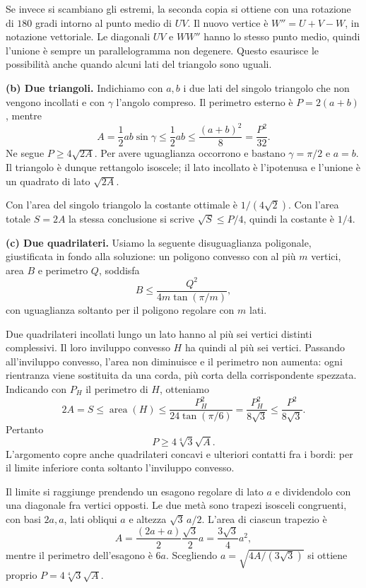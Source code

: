 {Se invece si scambiano gli estremi, la seconda copia si ottiene
con una rotazione di $180$ gradi intorno al punto medio di $UV$.
Il nuovo vertice \`e $W''=U+V-W$, in notazione vettoriale.
Le diagonali $UV$ e $WW''$ hanno lo stesso punto medio,
quindi l'unione \`e sempre un parallelogramma non degenere.
Questo esaurisce le possibilit\`a anche quando alcuni lati del
triangolo sono uguali.

\textbf{(b) Due triangoli.}
Indichiamo con $a,b$ i due lati del singolo triangolo che non vengono
incollati e con $\gamma$ l'angolo compreso. Il perimetro esterno \`e
$P=2(a+b)$, mentre
\[
 A=\frac12 ab\sin\gamma
 \le\frac12 ab
 \le\frac{(a+b)^2}{8}
 =\frac{P^2}{32}.
\]
Ne segue $P\ge4\sqrt{2A}$.
Per avere uguaglianza occorrono e bastano $\gamma=\pi/2$ e $a=b$.
Il triangolo \`e dunque rettangolo isoscele; il lato incollato
\`e l'ipotenusa e l'unione \`e un quadrato di lato $\sqrt{2A}$.

Con l'area del singolo triangolo la costante ottimale \`e
$1/(4\sqrt2)$. Con l'area totale $S=2A$ la stessa conclusione
si scrive $\sqrt S\le P/4$, quindi la costante \`e $1/4$.

\textbf{(c) Due quadrilateri.}
Usiamo la seguente disuguaglianza poligonale, giustificata in fondo
alla soluzione: un poligono convesso con al pi\`u $m$ vertici,
area $B$ e perimetro $Q$, soddisfa
\[
 B\le\frac{Q^2}{4m\tan(\pi/m)},
\]
con uguaglianza soltanto per il poligono regolare con $m$ lati.

Due quadrilateri incollati lungo un lato hanno al pi\`u sei vertici
distinti complessivi. Il loro inviluppo convesso $H$ ha quindi
al pi\`u sei vertici. Passando all'inviluppo convesso, l'area
non diminuisce e il perimetro non aumenta: ogni rientranza viene
sostituita da una corda, pi\`u corta della corrispondente spezzata.
Indicando con $P_H$ il perimetro di $H$, otteniamo
\[
 2A=S\le\operatorname{area}(H)
 \le\frac{P_H^2}{24\tan(\pi/6)}
 =\frac{P_H^2}{8\sqrt3}
 \le\frac{P^2}{8\sqrt3}.
\]
Pertanto
\[
 P\ge4\sqrt[4]{3}\sqrt A.
\]
L'argomento copre anche quadrilateri concavi e ulteriori contatti
fra i bordi: per il limite inferiore conta soltanto l'inviluppo convesso.

Il limite si raggiunge prendendo un esagono regolare di lato $a$
e dividendolo con una diagonale fra vertici opposti.
Le due met\`a sono trapezi isosceli congruenti, con basi $2a,a$,
lati obliqui $a$ e altezza $\sqrt3\,a/2$.
L'area di ciascun trapezio \`e
\[
 A=\frac{(2a+a)}2\frac{\sqrt3}{2}a
 =\frac{3\sqrt3}{4}a^2,
\]
mentre il perimetro dell'esagono \`e $6a$.
Scegliendo $a=\sqrt{4A/(3\sqrt3)}$ si ottiene proprio
$P=4\sqrt[4]{3}\sqrt A$.

}
